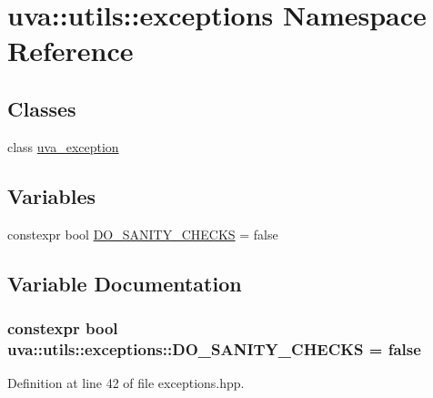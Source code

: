 \hypertarget{namespaceuva_1_1utils_1_1exceptions}{}\section{uva\+:\+:utils\+:\+:exceptions Namespace Reference}
\label{namespaceuva_1_1utils_1_1exceptions}
\subsection*{Classes}
\begin{DoxyCompactItemize}
\item 
class \hyperlink{classuva_1_1utils_1_1exceptions_1_1uva__exception}{uva\+\_\+exception}
\end{DoxyCompactItemize}
\subsection*{Variables}
\begin{DoxyCompactItemize}
\item 
constexpr bool \hyperlink{namespaceuva_1_1utils_1_1exceptions_ae769de24af658b2759564fbbfea5c5f0}{D\+O\+\_\+\+S\+A\+N\+I\+T\+Y\+\_\+\+C\+H\+E\+C\+K\+S} = false
\end{DoxyCompactItemize}


\subsection{Variable Documentation}
\hypertarget{namespaceuva_1_1utils_1_1exceptions_ae769de24af658b2759564fbbfea5c5f0}{}
\subsubsection[{D\+O\+\_\+\+S\+A\+N\+I\+T\+Y\+\_\+\+C\+H\+E\+C\+K\+S}]{\setlength{\rightskip}{0pt plus 5cm}constexpr bool uva\+::utils\+::exceptions\+::\+D\+O\+\_\+\+S\+A\+N\+I\+T\+Y\+\_\+\+C\+H\+E\+C\+K\+S = false}\label{namespaceuva_1_1utils_1_1exceptions_ae769de24af658b2759564fbbfea5c5f0}


Definition at line 42 of file exceptions.\+hpp.

